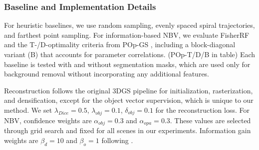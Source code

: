 
\subsubsection{Baseline and Implementation Details}
For heuristic baselines, we use random sampling, evenly spaced spiral trajectories, and farthest point sampling. For information-based \ac{NBV}, we evaluate FisherRF \cite{jiang2024fisherrf} and the T-/D-optimality criteria from POp-GS \cite{wilson2025pop}, including a block-diagonal variant (B) that accounts for parameter correlations. (POp-T/D/B in table) Each baseline is tested with and without segmentation masks, which are used only for background removal without incorporating any additional features.


Reconstruction follows the original \ac{3DGS} pipeline for initialization, rasterization, and densification, except for the object vector supervision, which is unique to our method. We set $\lambda_{Dice} = 0.5$, $\lambda_{obj}=0.1$, $\delta_{obj}=0.1$ for the reconstruction loss. For \ac{NBV}, confidence weights are $\alpha_{obj}=0.3$ and $\alpha_{opa}=0.3$. These values are selected through grid search and fixed for all scenes in our experiments. Information gain weights are $\beta_{d}=10$ and $\beta_{o}=1$ following \cite{strong2024next}.


